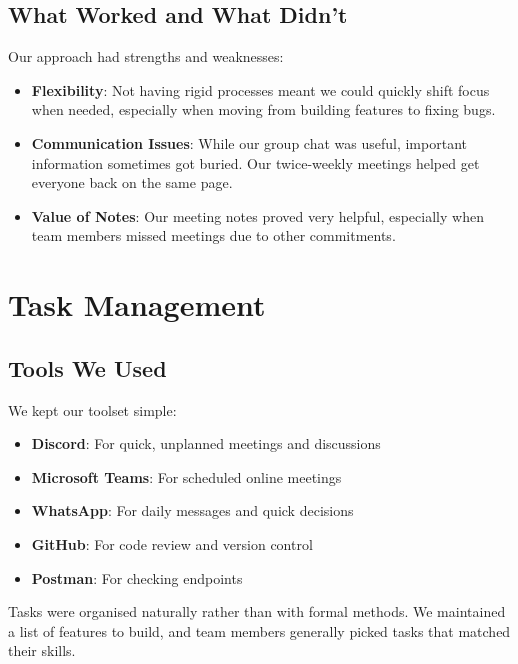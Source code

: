 \subsection{What Worked and What Didn't}

Our approach had strengths and weaknesses:

\begin{itemize}
    \item \textbf{Flexibility}: Not having rigid processes meant we could quickly shift focus when needed, especially when moving from building features to fixing bugs.
    
    \item \textbf{Communication Issues}: While our group chat was useful, important information sometimes got buried. Our twice-weekly meetings helped get everyone back on the same page.
    
    \item \textbf{Value of Notes}: Our meeting notes proved very helpful, especially when team members missed meetings due to other commitments.
\end{itemize}

\section{Task Management}

\subsection{Tools We Used}

We kept our toolset simple:

\begin{itemize}
    \item \textbf{Discord}: For quick, unplanned meetings and discussions
    
    \item \textbf{Microsoft Teams}: For scheduled online meetings
    
    \item \textbf{WhatsApp}: For daily messages and quick decisions
    
    \item \textbf{GitHub}: For code review and version control

    \item \textbf{Postman}: For checking endpoints
\end{itemize}

Tasks were organised naturally rather than with formal methods. We maintained a list of features to build, and team members generally picked tasks that matched their skills.

